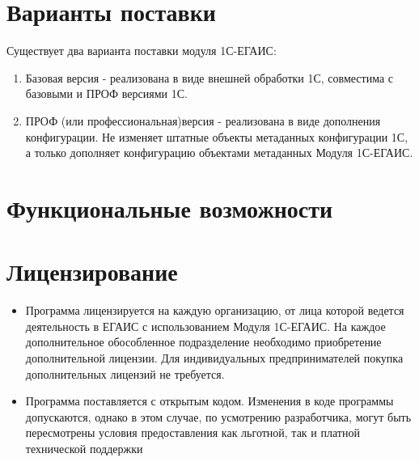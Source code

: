 \documentclass[letterpaper,10pt,russian]{sphinxmanual}
\begin{document}
\section{Варианты поставки}
\label{intro:id3}
Существует два варианта поставки модуля 1С-ЕГАИС:
\begin{enumerate}
\item {} 
Базовая версия - реализована в виде внешней обработки 1С, совместима с базовыми и ПРОФ версиями 1С.

\item {} 
ПРОФ (или профессиональная)версия - реализована в виде дополнения конфигурации. Не изменяет штатные объекты метаданных конфигурации 1С, а только дополняет конфигурацию объектами метаданных Модуля 1С-ЕГАИС.

\end{enumerate}


\section{Функциональные возможности}
\label{intro:id4}

\section{Лицензирование}
\label{intro:id5}\begin{itemize}
\item {} 
Программа лицензируется на каждую организацию, от лица которой ведется деятельность в ЕГАИС с использованием Модуля 1С-ЕГАИС. На каждое дополнительное обособленное подразделение необходимо приобретение дополнительной лицензии. Для индивидуальных предпринимателей покупка дополнительных лицензий не требуется.

\item {} 
Программа поставляется с открытым кодом. Изменения в коде программы допускаются, однако в этом случае, по усмотрению разработчика, могут быть пересмотрены условия предоставления как льготной, так и платной технической поддержки

\end{itemize}
\end{document}
